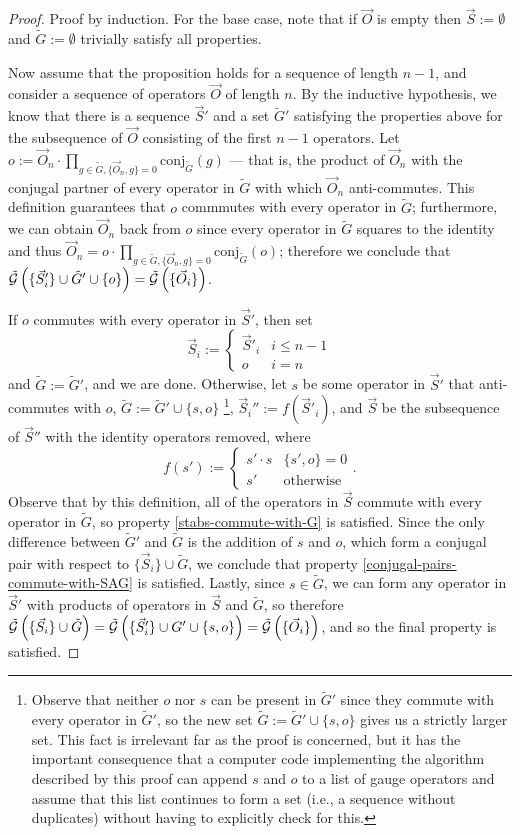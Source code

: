 \documentclass[twocolumn,showpacs,preprintnumbers,amsmath,amssymb,nofootinbib,pra,floatfix]{revtex4-1}
\newcommand{\lst}{\vec}
\newcommand{\set}{\tilde}
\newcommand{\genfun}{\tilde{\mathcal{G}}}
\begin{document}
\begin{proof}
Proof by induction.  For the base case, note that if $\lst O$ is empty then $\lst S:=\emptyset$ and $\set G:=\emptyset$ trivially satisfy all properties.

Now assume that the proposition holds for a sequence of length $n-1$, and consider a sequence of operators $\lst O$ of length $n$.  By the inductive hypothesis, we know that there is a sequence $\lst S'$ and a set $\set G'$ satisfying the properties above for the subsequence of $\lst O$ consisting of the first $n-1$ operators.  Let $o:=\lst O_n\cdot \prod_{g\in \set G, \{\lst O_n,g\}=0} \text{conj}_{\set G}(g)$ --- that is, the product of $\lst O_n$ with the conjugal partner of every operator in $\set G$ with which $\lst O_n$ anti-commutes.  This definition guarantees that $o$ commmutes with every operator in $\set G$;  furthermore, we can obtain $\lst O_n$ back from $o$ since every operator in $\set G$ squares to the identity and thus $\lst O_n=o\cdot \prod_{g\in \set G, \{\lst O_n,g\}=0} \text{conj}_{\set G}(o)$; therefore we conclude that $\genfun\paren{\{\lst S'_i\} \cup \set G' \cup \{o\}}=\genfun\paren{\{\lst O_i\}}$.

If $o$ commutes with every operator in $\lst S'$, then set
$$\lst S_i :=
\begin{cases}
\lst S'_i & i \le n-1 \\
o & i = n
\end{cases}
$$
and $\set G := \set G'$, and we are done.  Otherwise, let $s$ be some operator in $\lst S'$ that anti-commutes with $o$, $\set G:=\set G'\cup \{s,o\}$
\footnote{Observe that neither $o$ nor $s$ can be present in $\set G'$ since they commute with every operator in $\set G'$, so the new set $\set G:=\set G'\cup \{s,o\}$ gives us a strictly larger set.  This fact is irrelevant far as the proof is concerned, but it has the important consequence that a computer code implementing the algorithm described by this proof can append $s$ and $o$ to a list of gauge operators and assume that this list continues to form a set (i.e., a sequence without duplicates) without having to explicitly check for this.}, $\lst S_i'' := f(\lst S'_i)$, and $\lst S$ be the subsequence of $\lst S''$ with the identity operators removed, where
$$
f(s') :=
\begin{cases}
s'\cdot s & \{s',o\}=0\\
s' & \text{otherwise}
\end{cases}.
$$
Observe that by this definition, all of the operators in $\lst S$ commute with every operator in $\set G$, so property \ref{stabs-commute-with-G} is satisfied.  Since the only difference between $\set G'$ and $\set G$ is the addition of $s$ and $o$, which form a conjugal pair with respect to $\{\lst S_i\} \cup \set G$, we conclude that property \ref{conjugal-pairs-commute-with-SAG} is satisfied.
Lastly, since $s\in \set G$, we can form any operator in $\lst S'$ with products of operators in $\lst S$ and $\set G$, so therefore $\genfun\paren{\{\lst S_i\} \cup \set G}=\genfun\paren{\{\lst S'_i\} \cup G' \cup \{s,o\}}=\genfun\paren{\{\lst O_i\}}$, and so the final property is satisfied.


\end{proof}
\end{document}
